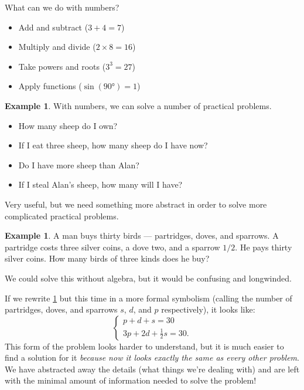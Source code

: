 \documentclass[a4paper]{amsart}
\theoremstyle{definition}
\newtheorem{ex}[thm]{Example}
\theoremstyle{remark}
\begin{document}
  What can we do with numbers?
  \begin{itemize}
    \item Add and subtract ($ 3 + 4 = 7 $)
    \item Multiply and divide ($ 2 \times 8 = 16 $)
    \item Take powers and roots ($ 3^3 = 27 $)
    \item Apply functions ($ \sin (\ang{90}) = 1 $)
  \end{itemize}
  \begin{ex}
    With numbers, we can solve a number of practical problems.
    \begin{itemize}
      \item How many sheep do I own?
      \item If I eat three sheep, how many sheep do I have now?
      \item Do I have more sheep than Alan?
      \item If I steal Alan's sheep, how many will I have?
    \end{itemize}
  \end{ex}

  Very useful, but we need something more abstract in order to solve more complicated practical problems.
  \begin{ex}\label{ex:manybirds}
    A man buys thirty birds --- partridges, doves, and sparrows. A partridge costs three silver coins,
    a dove two, and a sparrow $1/2$. He pays thirty silver coins. How many birds of three kinds does he buy?
  \end{ex}
  We could solve this without algebra, but it would be confusing and longwinded.

  If we rewrite \cref{ex:manybirds} but this time in a more formal symbolism (calling the number of partridges, doves, and sparrows $ s $, $ d $,
  and $ p $ respectively), it looks like:
  \begin{equation}
    \begin{cases}
      p + d + s = 30\\
      3p + 2d + \frac{1}{2}s = 30.
    \end{cases}
  \end{equation}
  This form of the problem looks harder to understand, but it is much easier to find a solution for it \emph{because
  now it looks exactly the same as every other problem}. We have abstracted away the details (what things we're dealing
  with) and are left with the minimal amount of information needed to solve the problem!
\end{document}
